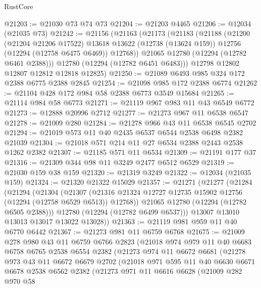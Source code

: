 \begin{lexlean}{RustCore}
\begin{coremodule}
@21203 := @21030 @73 @74 @73
@21204 := @21203 @4465
@21206 := @12034 (@21035 @73)
@21242 := @21156
    (@21163
      (@21173
        (@21183
          (@21188
            (@21200
              (@21204 @21206 @17522)
              @13618
              @13622
              (@12738 (@13624 @159))
              @12756
              (@12294 (@12758 @6475 @6469))
              @12768))
          @21065
          @12780
          (@12294 (@12782 @6461 @2388)))
        @12780
        (@12294 (@12782 @6451 @6483)))
      @12798
      @12802
      @12807
      @12812
      @12818
      @12825)
@21250 := @21089 @6493 @985 @324 @172 @2388 @6775 @2388 @2845
@21254 := @21098 @985 @172 @2388 @6774
@21262 := @21104 @428 @172 @984 @58 @2388 @6773 @3549 @15684
@21265 := @21114 @984 @58 @6773
@21271 := @21119 @967 @983 @11 @43 @6549 @6772
@21273 := @12888 @20996 @2712
@21277 := @21273 @967 @11 @6538 @6547
@21278 := @21009 @280
@21284 := @21278 @966 @43 @11 @6538 @6545 @2702
@21294 := @21019 @573 @11 @40 @2435 @6537 @6544 @2538 @6498 @2382 @21039
@21304 := @21018 @571 @214 @11 @27 @6534 @2388 @2443 @2538 @1262 @2382
@21307 := @21185 @571 @11 @6534
@21309 := @21191 @177 @37
@21316 := @21309 @344 @98 @11 @3249 @2477 @6512 @6529
@21319 := @21030 @159 @38 @159
@21320 := @21319 @3249
@21322 := @12034 (@21035 @159)
@21324 := @21320 @21322 @15029
@21357 := @21271
    (@21277
      (@21284
        (@21294
          (@21304
            (@21307
              (@21316 @21324 @12727 @12735 @15902 @12756 (@12294 (@12758 @6529 @6513)) @12768))
            @21065
            @12780
            (@12294 (@12782 @6505 @2388)))
          @12780
          (@12294 (@12782 @6499 @6537)))
        @13007
        @13010
        @13013
        @13017
        @13022
        @13028))
@21363 := @21119 @981 @959 @11 @40 @6770 @6442
@21367 := @21273 @981 @11 @6759 @6768
@21675 := @21009
    @278
    @980
    @43
    @11
    @6759
    @6766
    @2823
    (@21018
      @974
      @979
      @11
      @40
      @6683
      @6758
      @6765
      @2538
      @6554
      @2382
      (@21273
        @974
        @11
        @6672
        @6681
        (@21278
          @973
          @43
          @11
          @6672
          @6679
          @2702
          (@21018
            @971
            @595
            @11
            @40
            @6630
            @6671
            @6678
            @2538
            @6562
            @2382
            (@21273
              @971
              @11
              @6616
              @6628
              (@21009
                @282
                @970
                @58

\end{coremodule}
\end{lexlean}
